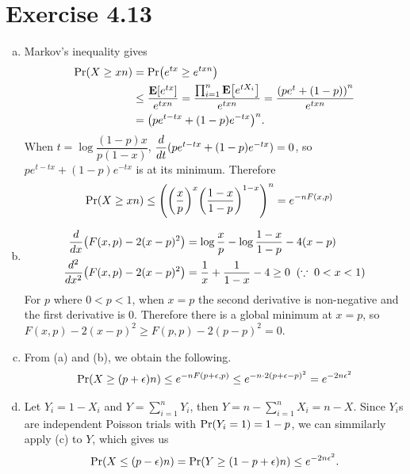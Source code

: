 \documentclass{article}
\begin{document}
\section*{Exercise 4.13}
\begin{enumerate}[(a)]
  \item Markov's inequality gives
  \begin{align*}
    \mathrm{Pr}\qty(X \geq xn) &= \mathrm{Pr}\qty(e^{tx} \geq e^{txn}) \\
    &\leq \frac{\mathbf{E}\qty[e^{tx}]}{e^{txn}} = \frac{\prod_{i=1}^{n}\mathbf{E}\qty[e^{tX_i}]}{e^{txn}} = \frac{\qty(pe^t + (1-p))^n}{e^{txn}} \\
    &= \qty(pe^{t-tx} + (1-p)e^{-tx})^n.
  \end{align*}
  When $t = \log\dfrac{(1-p)x}{p(1-x)}$, $\dfrac{d}{dt}\qty(pe^{t-tx} + (1-p)e^{-tx}) = 0$, so $pe^{t-tx} + (1-p)e^{-tx}$ is at its minimum.
  Therefore
  \begin{align*}
    \mathrm{Pr}\qty(X \geq xn) &\leq \qty(\qty(\frac{x}{p})^x\qty(\frac{1-x}{1-p})^{1-x})^n = e^{-nF(x, p)}
  \end{align*}
  \item
  \begin{align*}
    \frac{d}{dx}\qty(F(x, p) - 2(x-p)^2) &= \log{\frac{x}{p}} - \log{\frac{1-x}{1-p}} - 4(x-p) \\
    \frac{d^2}{dx^2}\qty(F(x, p) - 2(x-p)^2) &= \frac{1}{x} + \frac{1}{1-x} - 4 \geq 0 \;\;\qty(\because \; 0 < x < 1)
  \end{align*}
  For $p$ where $0 < p < 1$, when $x=p$ the second derivative is non-negative and the first derivative is $0$.
  Therefore there is a global minimum at $x=p$, so $F(x, p) - 2(x-p)^2 \geq F(p, p) - 2(p-p)^2 = 0$.
  \item From (a) and (b), we obtain the following.
  \begin{align*}
    \mathrm{Pr}\qty(X \geq (p+\epsilon)n) \leq e^{-nF(p+\epsilon, p)} \leq e^{-n\cdot 2(p+\epsilon - p)^2} = e^{-2n\epsilon^2}
  \end{align*}
  \item Let $Y_i = 1 - X_i$ and $\displaystyle Y = \sum_{i=1}^{n}Y_i$, then $\displaystyle Y = n - \sum_{i=1}^{n}X_i = n - X$.
  Since $Y_i$s are independent Poisson trials with $\mathrm{Pr}\qty(Y_i = 1) = 1-p$, we can simmilarly apply (c) to $Y$, which gives us
  \begin{align*}
    \mathrm{Pr}\qty(X \leq (p-\epsilon)n) = \mathrm{Pr}\qty(Y \geq (1-p+\epsilon)n) \leq e^{-2n\epsilon^2}.
  \end{align*}
\end{enumerate}
\end{document}
